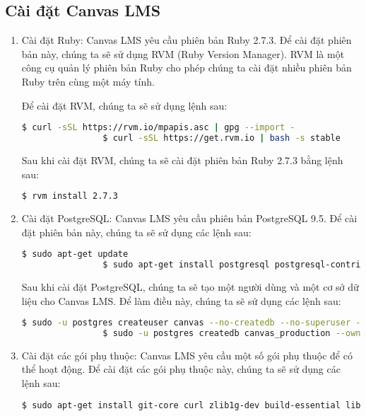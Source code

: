 \documentclass[../Thesis.tex]{subfiles}
\begin{document}
    \subsection{Cài đặt Canvas LMS}
        \begin{enumerate}
            \item Cài đặt Ruby: Canvas LMS yêu cầu phiên bản Ruby 2.7.3. Để cài đặt phiên bản này, chúng ta sẽ sử dụng RVM (Ruby Version Manager). RVM là một công cụ quản lý phiên bản Ruby cho phép chúng ta cài đặt nhiều phiên bản Ruby trên cùng một máy tính.

            Để cài đặt RVM, chúng ta sẽ sử dụng lệnh sau:
            \begin{lstlisting}[language=bash]
                $ curl -sSL https://rvm.io/mpapis.asc | gpg --import -
                $ curl -sSL https://get.rvm.io | bash -s stable
            \end{lstlisting}

            Sau khi cài đặt RVM, chúng ta sẽ cài đặt phiên bản Ruby 2.7.3 bằng lệnh sau:
            \begin{lstlisting}[language=bash]
                $ rvm install 2.7.3
            \end{lstlisting}

            \item Cài đặt PostgreSQL: Canvas LMS yêu cầu phiên bản PostgreSQL 9.5. Để cài đặt phiên bản này, chúng ta sẽ sử dụng các lệnh sau:
            \begin{lstlisting}[language=bash]
                $ sudo apt-get update
                $ sudo apt-get install postgresql postgresql-contrib
            \end{lstlisting}

            Sau khi cài đặt PostgreSQL, chúng ta sẽ tạo một người dùng và một cơ sở dữ liệu cho Canvas LMS. Để làm điều này, chúng ta sẽ sử dụng các lệnh sau:
            \begin{lstlisting}[language=bash]
                $ sudo -u postgres createuser canvas --no-createdb --no-superuser --no-createrole --pwprompt
                $ sudo -u postgres createdb canvas_production --owner=canvas
            \end{lstlisting}

            \item Cài đặt các gói phụ thuộc: Canvas LMS yêu cầu một số gói phụ thuộc để có thể hoạt động. Để cài đặt các gói phụ thuộc này, chúng ta sẽ sử dụng các lệnh sau:
            \begin{lstlisting}[language=bash]
                $ sudo apt-get install git-core curl zlib1g-dev build-essential libssl-dev libreadline-dev libyaml-dev libsqlite3-dev sqlite3 libxml2-dev libxslt1-dev libcurl4-openssl-dev software-properties-common libffi-dev
            \end{lstlisting}


\end{enumerate}
\end{document}
